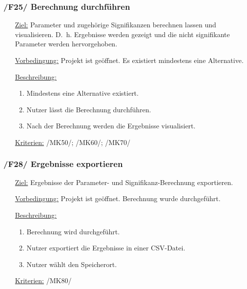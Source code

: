 \documentclass{article}
\begin{document}
\subsubsection*{\textbf{/F25/} Berechnung durchführen} \label{sec:f:Berechnung durchführen}
\begin{itemize}
    \item[\underline{Ziel:}] Parameter und zugehörige Signifikanzen berechnen lassen und visualisieren. D.~h. Ergebnisse werden gezeigt und die nicht signifikante Parameter werden hervorgehoben.
    \item[\underline{Vorbedingung:}] Projekt ist geöffnet. Es existiert mindestens eine Alternative.
    \item[\underline{Beschreibung:}]
    \begin{enumerate}
        \item Mindestens eine Alternative existiert.
        \item Nutzer lässt die Berechnung durchführen.
        \item Nach der Berechnung werden die Ergebnisse visualisiert.
    \end{enumerate}
    \item[\underline{Kriterien:}] /MK50/; /MK60/; /MK70/ 
\end{itemize} 

\subsubsection*{\textbf{/F28/} Ergebnisse exportieren} \label{sec:f:Ergebnisse exportieren}
\begin{itemize}
    \item[\underline{Ziel:}] Ergebnisse der Parameter- und Signifikanz-Berechnung exportieren.
    \item[\underline{Vorbedingung:}] Projekt ist geöffnet. Berechnung wurde durchgeführt.
    \item[\underline{Beschreibung:}]
    \begin{enumerate}
        \item Berechnung wird durchgeführt.
        \item Nutzer exportiert die Ergebnisse in einer CSV-Datei.
        \item Nutzer wählt den Speicherort.
    \end{enumerate}
    \item[\underline{Kriterien:}] /MK80/
\end{itemize}
\end{document}
